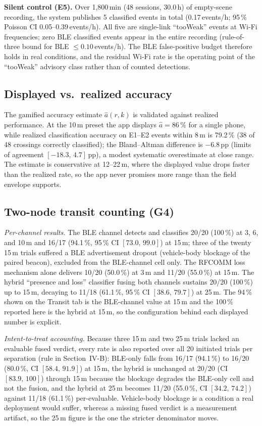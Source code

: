\documentclass[journal,10pt]{IEEEtran}
\begin{document}
\textbf{Silent control (E5).} Over 1{,}800\,min (48 sessions, 30.0\,h) of
empty-scene recording, the system publishes 5 classified events in total
(0.17\,events/h; 95\,\% Poisson CI 0.05--0.39\,events/h). All five are
single-link ``tooWeak'' events at Wi-Fi frequencies; zero BLE classified events
appear in the entire recording (rule-of-three bound for BLE
$\leq0.10$\,events/h). The BLE false-positive budget therefore holds in real
conditions, and the residual Wi-Fi rate is the operating point of the
``tooWeak'' advisory class rather than of counted detections.

\subsection{Displayed vs.\ realized accuracy}
The gamified accuracy estimate $\hat{a}(r,k)$ is validated against realized
performance. At the 10\,m preset the app displays $\hat{a} = 86\,\%$ for a
single phone, while realized classification accuracy on E1--E2 events within
8\,m is 79.2\,\% (38 of 48 crossings correctly classified); the Bland--Altman
difference is $-6.8$\,pp (limits of agreement $[-18.3,\,4.7]$\,pp), a modest
systematic overestimate at close range. The estimate is conservative at
12--22\,m, where the displayed value drops faster than the realized rate, so
the app never promises more range than the field envelope supports.

\subsection{Two-node transit counting (G4)}
\label{sec:transitres}
\emph{Per-channel results.} The BLE channel detects and classifies 20/20
(100\,\%) at 3, 6, and 10\,m and 16/17 (94.1\,\%, 95\,\% CI $[73.0,\,99.0]$)
at 15\,m; three of the twenty 15\,m trials suffered a BLE advertisement
dropout (vehicle-body blockage of the paired beacon), excluded from the
BLE-channel cell only. The RFCOMM loss mechanism alone delivers 10/20
(50.0\,\%) at 3\,m and 11/20 (55.0\,\%) at 15\,m. The hybrid ``presence and
loss'' classifier fusing both channels sustains 20/20 (100\,\%) up to 15\,m,
decaying to 11/18 (61.1\,\%, 95\,\% CI $[38.6,\,79.7]$) at 25\,m. The 94\,\%
shown on the Transit tab is the BLE-channel value at 15\,m and the 100\,\%
reported here is the hybrid at 15\,m, so the configuration behind each
displayed number is explicit.

\emph{Intent-to-treat accounting.} Because three 15\,m and two 25\,m trials
lacked an evaluable fused verdict, every rate is also reported over all 20
initiated trials per separation (rule in Section~IV-B): BLE-only falls from
16/17 (94.1\,\%) to 16/20 (80.0\,\%, CI $[58.4,\,91.9]$) at 15\,m, the hybrid
is unchanged at 20/20 (CI $[83.9,\,100]$) through 15\,m because the blockage
degrades the BLE-only cell and not the fusion, and the hybrid at 25\,m becomes
11/20 (55.0\,\%, CI $[34.2,\,74.2]$) against 11/18 (61.1\,\%) per-evaluable.
Vehicle-body blockage is a condition a real deployment would suffer, whereas a
missing fused verdict is a measurement artifact, so the 25\,m figure is the one
the stricter denominator moves.
\end{document}
